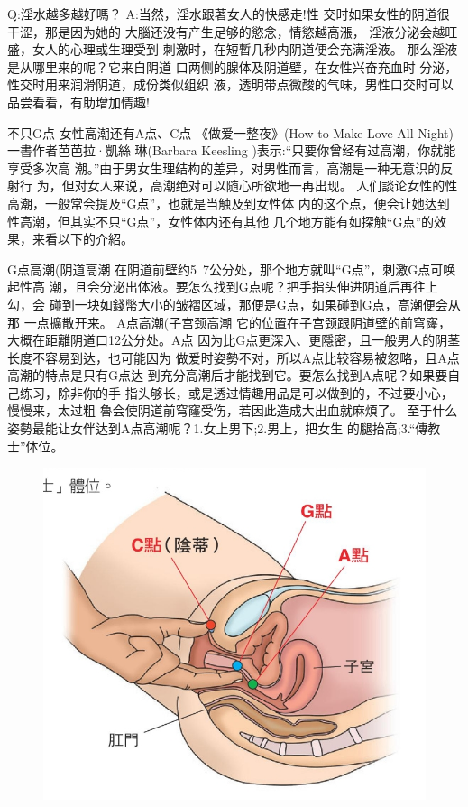 \documentclass[12pt,UTF8]{ctexbook}
\begin{document}
Q:淫水越多越好嗎？
A:当然，淫水跟著女人的快感走!性
交时如果女性的阴道很干涩，那是因为她的
大腦还没有产生足够的慾念，情慾越高漲，
淫液分泌会越旺盛，女人的心理或生理受到
刺激时，在短暫几秒内阴道便会充满淫液。
那么淫液是从哪里来的呢？它来自阴道
口两侧的腺体及阴道壁，在女性兴奋充血时
分泌，性交时用来润滑阴道，成份类似组织
液，透明带点微酸的气味，男性口交时可以
品尝看看，有助增加情趣!

不只G点
女性高潮还有A点、C点
《做爱一整夜》(How to Make Love All Night)一書作者芭芭拉·凱絲
琳(Barbara Keesling )表示:“只要你曾经有过高潮，你就能享受多次高
潮。”由于男女生理结构的差异，对男性而言，高潮是一种无意识的反射行
为，但对女人来说，高潮绝对可以随心所欲地一再出现。
人们談论女性的性高潮，一般常会提及“G点”，也就是当触及到女性体
内的这个点，便会让她达到性高潮，但其实不只“G点”，女性体内还有其他
几个地方能有如探触“G点”的效果，来看以下的介紹。

G点高潮(阴道高潮
在阴道前壁约5~7公分处，那个地方就叫“G点”，刺激G点可唤起性高
潮，且会分泌出体液。要怎么找到G点呢？把手指头伸进阴道后再往上勾，会
碰到一块如錢幣大小的皱褶区域，那便是G点，如果碰到G点，高潮便会从那
一点擴散开来。
A点高潮(子宫颈高潮
它的位置在子宫颈跟阴道壁的前穹窿，大概在距離阴道口12公分处。A点
因为比G点更深入、更隱密，且一般男人的阴茎长度不容易到达，也可能因为
做爱时姿勢不对，所以A点比较容易被忽略，且A点高潮的特点是只有G点达
到充分高潮后才能找到它。要怎么找到A点呢？如果要自己练习，除非你的手
指头够长，或是透过情趣用品是可以做到的，不过要小心，慢慢来，太过粗
魯会使阴道前穹窿受伤，若因此造成大出血就麻煩了。
至于什么姿勢最能让女伴达到A点高潮呢？1.女上男下;2.男上，把女生
的腿抬高;3.“傳教士”体位。

\begin{figure}[htbp]
	\centering
	\includegraphics[width=0.7\linewidth]{16}
	\caption{}
	\label{fig:1}
\end{figure}
\end{document}
